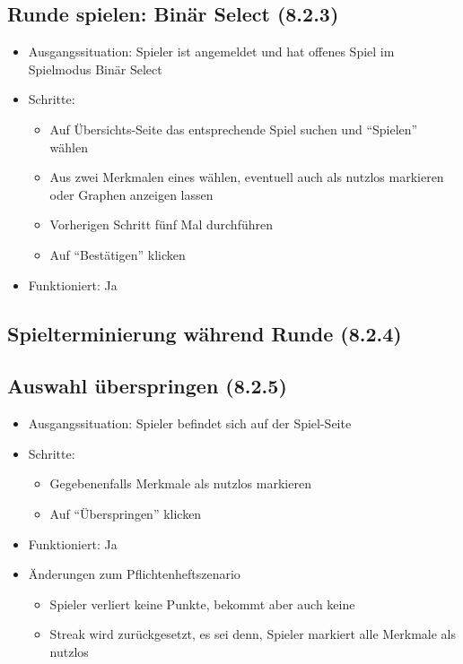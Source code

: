 \documentclass[a4paper]{scrreprt}
\begin{document}
            \subsection{Runde spielen: Binär Select (8.2.3)}
            \begin{itemize}
                \item Ausgangssituation: Spieler ist angemeldet und hat offenes Spiel im Spielmodus Binär Select
                \item Schritte:
                    \begin{itemize}
                        \item Auf Übersichts-Seite das entsprechende Spiel suchen und \enquote{Spielen} wählen
                        \item Aus zwei Merkmalen eines wählen, eventuell auch als nutzlos markieren oder Graphen anzeigen lassen
                        \item Vorherigen Schritt fünf Mal durchführen
                        \item Auf \enquote{Bestätigen} klicken
                    \end{itemize}
                \item Funktioniert: Ja
            \end{itemize}

            \subsection{Spielterminierung während Runde (8.2.4)}

            \subsection{Auswahl überspringen (8.2.5)}
            \begin{itemize}
                \item Ausgangssituation: Spieler befindet sich auf der Spiel-Seite
                \item Schritte:
                    \begin{itemize}
                        \item Gegebenenfalls Merkmale als nutzlos markieren
                        \item Auf \enquote{Überspringen} klicken
                    \end{itemize}
                \item Funktioniert: Ja
                \item Änderungen zum Pflichtenheftszenario
                \begin{itemize}
                    \item Spieler verliert keine Punkte, bekommt aber auch keine
                    \item Streak wird zurückgesetzt, es sei denn, Spieler markiert alle Merkmale als nutzlos
                \end{itemize}
            \end{itemize}
\end{document}
